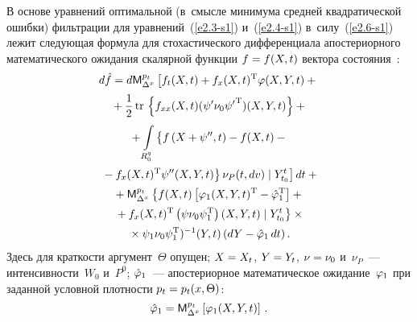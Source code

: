 \begin{multicols}{2}
В основе уравнений оптимальной (в~смыс\-ле минимума средней квадратической ошибки) 
фильт\-ра\-ции для уравнений~(\ref{e2.3-s1}) и~(\ref{e2.4-s1}) 
в~силу~(\ref{e2.6-s1}) лежит следу\-ющая формула для стохастического дифференциала 
апостериорного математического ожидания скалярной функции  $f\hm=f(X,t)$ вектора 
состояния~\cite{8-s1}:
\begin{multline}
d \hat f = d \mm_{\Delta^x}^{p_t} \left[ f_t 
(X,t) + f_x (X,t)^{\mathrm{T}} \vrp (X,Y,t) +{}\right.\\[1pt]
{}+ \fr{1}{2}\,\mathrm{tr}\, 
\left\{ f_{xx} (X,t) (\psi' \nu_0 {\psi'}^{\mathrm{T}}) (X,Y,t)\right\}+{}\\[1pt]
{}+ \iii_{R_0^q}  \left\{ 
\vphantom{f_x (X,t)^{\mathrm{T}}}
f \left(X+ \psi'' , t\right) - f(X,t) -{}\right.\\[1pt]
\left.\left.{}-
f_x (X,t)^{\mathrm{T}} \psi''(X,Y,t)\right\} \nu_P (t, dv)\mid Y_{t_0}^t \right] dt+{}\\[1pt]
  {}+\mm_{\Delta^x}^{p_t} \left\{ f(X,t) \left[ 
  \vrp_1 (X,Y,t)^{\mathrm{T}} -
  \hat \vrp_1^{\mathrm{T}}\right] +{}\right.\\[1pt]
\left.  {}+ f_x (X,t)^{\mathrm{T}} 
  \left(\psi\nu_0\psi_1^{\mathrm{T}}\right) (X,Y,t) \mid Y_{t_0}^t\right\} \times{}\\[1pt]
    {}\times \psi_1 \nu_0 \psi_1^{\mathrm{T}})^{-1} (Y,t) \left(dY-\hat\vrp_1 \,dt\right).
    \label{e2.7-s1}
    \end{multline}
Здесь для краткости аргумент~$\Theta$ опущен; $X\hm=X_t$, $Y\hm=Y_t$, $\nu\hm=\nu_0$ 
и~$\nu_P$~--- интенсивности~$W_0$ и~$P^0$;
$\hat{\varphi}_1$~--- апостериорное математическое ожидание~$\varphi_1$ при заданной условной плотности  
$p_t\hm=p_t (x, \Theta)$:
\begin{equation*}
\hat{\varphi}_1 = {\sf M}_{\Delta^x}^{p_t} \left[\varphi_1(X,Y,t)\right]\,.
\end{equation*}


\end{multicols}
